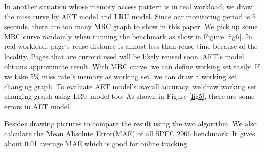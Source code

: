 \documentclass[10pt,twocolumn]{article}
\begin{document}
In another situation whose memory access pattern is in real workload, we draw the miss curve by AET model and LRU model. Since our monitoring period is 5 seconds, there are too many MRC graph to show in this paper. We pick up some MRC curve randomly when running the benchmark as show in Figure \ref{fig6}. In real workload, page's reuse distance is almost less than reuse time because of the locality. Pages that are current used will be likely reused soon. AET's model obtains approximate result. With MRC curve, we can define working set easily. If we take 5\% miss rate's memory as working set, we can draw a working set changing graph. To evaluate AET model's overall accuracy, we draw working set changing graph using LRU model too. As shown in Figure \ref{fig5}, there are some errors in AET model.

Besides drawing pictures to compare the result using the two algorithm. We also calculate the Mean Absolute Error(MAE) of all SPEC 2006 benchmark. It gives about 0.01 average MAE which is good for online tracking.
\end{document}
